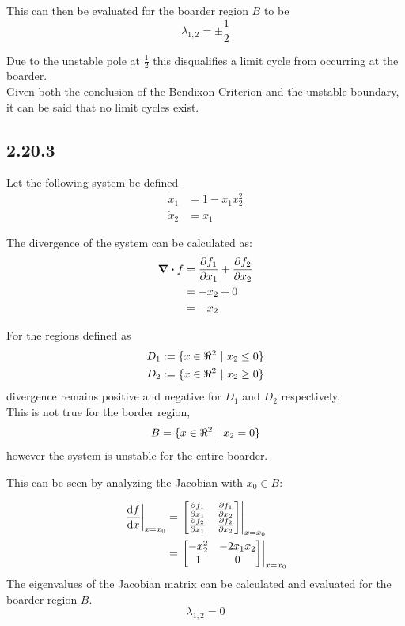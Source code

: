 \documentclass[letter]{article}
\begin{document}
This can then be evaluated for the boarder region $B$ to be
\begin{equation}
	\lambda_{1,2} = \pm \frac{1}{2}
\end{equation}

Due to the unstable pole at $\frac{1}{2}$ this disqualifies a limit cycle from occurring at the boarder.\\

Given both the conclusion of the Bendixon Criterion and the unstable boundary, it can be said that no limit cycles exist.


\newpage
\subsection{2.20.3}
Let the following system be defined
\begin{equation}
	\begin{aligned}
		\dot{x}_1 &= 1 - x_1 x_2^2\\
		\dot{x}_2 &= x_1
	\end{aligned}
\end{equation}


The divergence of the system can be calculated as:
\begin{align}
	\div f  &= \pdv{f_1}{x_1} + \pdv{f_2}{x_2} \nonumber\\
	&= -x_2 + 0\\
	&= - x_2
\end{align}

For the regions defined as
\begin{equation}
	\begin{aligned}
		D_1 &:= \{x \in \real^2 \ | \ x_2 \leq 0\}\\
		D_2 &:= \{x \in \real^2 \ | \ x_2 \geq 0\}
	\end{aligned}
\end{equation}
divergence remains positive and negative for $D_1$ and $D_2$ respectively.\\

This is not true for the border region,
\begin{equation}
	B = \{x \in \real^2 \ | \ x_2 = 0\}
\end{equation}
however the system is unstable for the entire boarder.

This can be seen by analyzing the Jacobian with $x_0 \in B$:

\begin{align}
	\eval{\dv{f}{x}}_{x=x_0} 
	&= \eval{\mqty[\pdv{f_1}{x_1} & \pdv{f_1}{x_2}\\
		\pdv{f_2}{x_1} & \pdv{f_2}{x_2}]}_{x=x_0}\\
	&= \eval{\mqty[-x_2^2 & -2 x_1 x_2\\ 1 & 0]}_{x=x_0}
\end{align}
The eigenvalues of the Jacobian matrix can be calculated and evaluated for the boarder region $B$.
\begin{equation}
	\lambda_{1,2} = 0
\end{equation}
\end{document}
